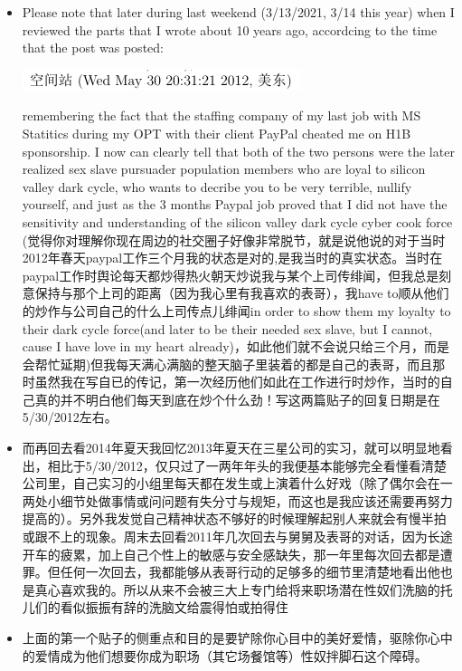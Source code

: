\documentclass[9pt, b5paper]{article}
\begin{document}
\begin{enumerate}
\begin{enumerate}
\begin{itemize}
\item Please note that later during last weekend (3/13/2021, 3/14 this year) when I reviewed the parts that I wrote about 10 years ago, accordcing to the time that the post was posted: 

\begin{center}
\includegraphics[width=.9\linewidth]{./pic/p1p108-date.png}
\end{center} remembering the fact that the staffing company of my last job with MS Statitics during my OPT with their client PayPal cheated me on H1B sponsorship. I now can clearly tell that both of the two persons were the later realized sex slave pursuader population members who are loyal to silicon valley dark cycle, who wants to decribe you to be very terrible, nullify yourself, and just as the 3 months Paypal job proved that I did not have the sensitivity and understanding of the silicon valley dark cycle cyber cook force (觉得你对理解你现在周边的社交圈子好像非常脱节，就是说他说的对于当时2012年春天paypal工作三个月我的状态是对的,是我当时的真实状态。当时在paypal工作时舆论每天都炒得热火朝天炒说我与某个上司传绯闻，但我总是刻意保持与那个上司的距离（因为我心里有我喜欢的表哥），我have to顺从他们的炒作与公司自己的什么上司传点儿绯闻in order to show them my loyalty to their dark cycle force(and later to be their needed sex slave, but I cannot, cause I have love in my heart already)，如此他们就不会说只给三个月，而是会帮忙延期)但我每天满心满脑的整天脑子里装着的都是自己的表哥，而且那时虽然我在写自已的传记，第一次经历他们如此在工作进行时炒作，当时的自己真的并不明白他们每天到底在炒个什么劲！写这两篇贴子的回复日期是在5/30/2012左右。
\item 而再回去看2014年夏天我回忆2013年夏天在三星公司的实习，就可以明显地看出，相比于5/30/2012，仅只过了一两年年头的我便基本能够完全看懂看清楚公司里，自己实习的小组里每天都在发生或上演着什么好戏（除了偶尔会在一两处小细节处做事情或问问题有失分寸与规矩，而这也是我应该还需要再努力提高的）。另外我发觉自己精神状态不够好的时候理解起别人来就会有慢半拍或跟不上的现象。周末去回看2011年几次回去与舅舅及表哥的对话，因为长途开车的疲累，加上自己个性上的敏感与安全感缺失，那一年里每次回去都是遭罪。但任何一次回去，我都能够从表哥行动的足够多的细节里清楚地看出他也是真心喜欢我的。所以从来不会被三大上专门给将来职场潜在性奴们洗脑的托儿们的看似振振有辞的洗脑文给震得怕或拍得住
\item 上面的第一个贴子的侧重点和目的是要铲除你心目中的美好爱情，驱除你心中的爱情成为他们想要你成为职场（其它场餐馆等）性奴拌脚石这个障碍。

\end{itemize}
\end{enumerate}
\end{enumerate}
\end{document}
